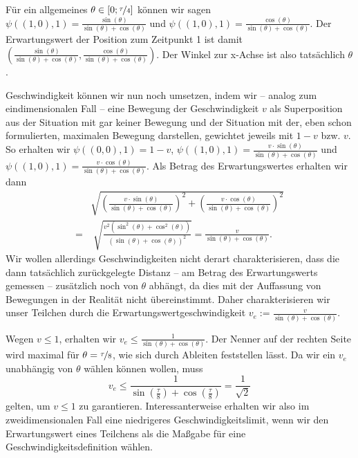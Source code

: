 \documentclass[a4paper,12pt,ngerman]{scrartcl}
\theoremstyle{plain}
\theoremstyle{plain}
\theoremstyle{plain}
\theoremstyle{plain}
\begin{document}
Für ein allgemeines $\theta\in[0;\nicefrac{\tau}{4}]$ können wir sagen $\psi((1,0),1)=\frac{\sin(\theta)}{\sin(\theta)+\cos(\theta)}$ und $\psi((1,0),1)=\frac{\cos(\theta)}{\sin(\theta)+\cos(\theta)}$. Der Erwartungswert der Position zum Zeitpunkt 1 ist damit 
$\left(\frac{\sin(\theta)}{\sin(\theta)+\cos(\theta)},\frac{\cos(\theta)}{\sin(\theta)+\cos(\theta)}\right)$. Der Winkel zur x-Achse ist also tatsächlich $\theta$. 

Geschwindigkeit können wir nun noch umsetzen, indem wir -- analog zum eindimensionalen Fall -- eine Bewegung der Geschwindigkeit $v$ als Superposition aus der Situation mit gar keiner Bewegung und der Situation mit der, eben schon formulierten, maximalen Bewegung darstellen, gewichtet jeweils mit $1-v$ bzw. $v$. So erhalten wir $\psi((0,0),1)=1-v$,\; $\psi((1,0),1)=\frac{v\cdot\sin(\theta)}{\sin(\theta)+\cos(\theta)}$ und $\psi((1,0),1)=\frac{v\cdot\cos(\theta)}{\sin(\theta)+\cos(\theta)}$. Als Betrag des Erwartungswertes erhalten wir dann
\begin{align*}
&\sqrt{\left(\frac{v\cdot\sin(\theta)}{\sin(\theta)+\cos(\theta)}\right)^2+\left(\frac{v\cdot\cos(\theta)}{\sin(\theta)+\cos(\theta)}\right)^2}\\
=&\;\sqrt{\frac{v^2(\sin^2(\theta)+\cos^2(\theta))}{(\sin(\theta)+\cos(\theta))^2}}=\frac{v}{\sin(\theta)+\cos(\theta)}.
\end{align*}
Wir wollen allerdings Geschwindigkeiten nicht derart charakterisieren, dass die dann tatsächlich zurückgelegte Distanz -- am Betrag des Erwartungswerts gemessen -- zusätzlich noch von $\theta$ abhängt, da dies mit der Auffassung von Bewegungen in der Realität nicht übereinstimmt. Daher charakterisieren wir unser Teilchen durch die 
Erwartungswertgeschwindigkeit $v_e:=\frac{v}{\sin(\theta)+\cos(\theta)}.$ 

Wegen $v\leq1$, erhalten wir $v_e\leq\frac{1}{\sin(\theta)+\cos(\theta)}$. Der Nenner auf der rechten Seite wird maximal für $\theta=\nicefrac{\tau}{8}$, wie sich durch Ableiten feststellen lässt. Da wir ein $v_e$ unabhängig von $\theta$ wählen können wollen, muss 
\[v_e\leq\frac{1}{\sin\left(\frac{\tau}{8}\right)+\cos\left(\frac{\tau}{8}\right)}=\frac{1}{\sqrt{2}}\]
gelten, um $v\leq1$ zu garantieren. Interessanterweise erhalten wir also im zweidimensionalen Fall eine niedrigeres Geschwindigkeitslimit, wenn wir den Erwartungswert eines Teilchens als die Maßgabe für eine Geschwindigkeitsdefinition wählen. 
\end{document}
